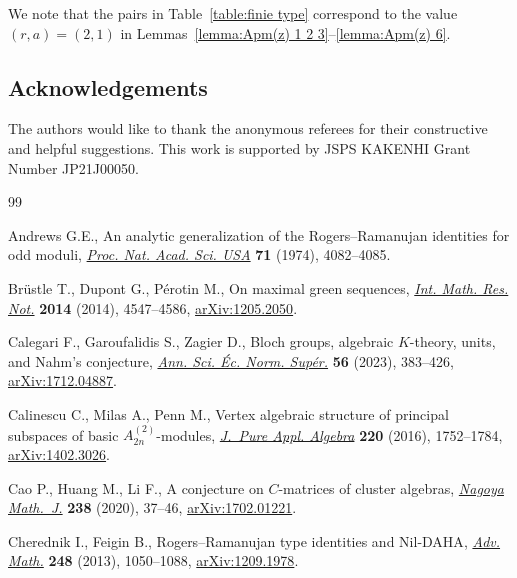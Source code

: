\documentclass[pdftex]{sigma}
\numberwithin{equation}{section}
\theoremstyle{definition}
\begin{document}
We note that the pairs in Table~\ref{table:finie type} correspond to the
value $(r, a) = (2, 1)$ in Lemmas~\ref{lemma:Apm(z) 1 2 3}--\ref{lemma:Apm(z) 6}.

\subsection*{Acknowledgements}
 The authors would like to thank the anonymous referees for their constructive and helpful suggestions.
	This work is supported by JSPS KAKENHI Grant Number JP21J00050.

\begin{thebibliography}{99}
\footnotesize\itemsep=0pt

Andrews G.E., An analytic generalization of the {R}ogers--{R}amanujan
 identities for odd moduli,
 \href{https://doi.org/10.1073/pnas.71.10.4082}{\textit{Proc. Nat. Acad. Sci.
 USA}} \textbf{71} (1974), 4082--4085.

Br\"ustle T., Dupont G., P\'erotin M., On maximal green sequences,
 \href{https://doi.org/10.1093/imrn/rnt075}{\textit{Int. Math. Res. Not.}}
 \textbf{2014} (2014), 4547--4586,
 \href{http://arxiv.org/abs/1205.2050}{arXiv:1205.2050}.

Calegari F., Garoufalidis S., Zagier D., Bloch groups, algebraic {$K$}-theory,
 units, and {N}ahm's conjecture,
 \href{https://doi.org/10.24033/asens.2537}{\textit{Ann. Sci. \'Ec. Norm.
 Sup\'er.}} \textbf{56} (2023), 383--426,
 \href{http://arxiv.org/abs/1712.04887}{arXiv:1712.04887}.

Calinescu C., Milas A., Penn M., Vertex algebraic structure of principal
 subspaces of basic {$A_{2n}^{(2)}$}-modules,
 \href{https://doi.org/10.1016/j.jpaa.2015.10.001}{\textit{J.~Pure Appl.
 Algebra}} \textbf{220} (2016), 1752--1784,
 \href{http://arxiv.org/abs/1402.3026}{arXiv:1402.3026}.

Cao P., Huang M., Li F., A conjecture on {$C$}-matrices of cluster algebras,
 \href{https://doi.org/10.1017/nmj.2018.18}{\textit{Nagoya Math.~J.}}
 \textbf{238} (2020), 37--46,
 \href{http://arxiv.org/abs/1702.01221}{arXiv:1702.01221}.

Cherednik I., Feigin B., Rogers--{R}amanujan type identities and {N}il-{DAHA},
 \href{https://doi.org/10.1016/j.aim.2013.08.025}{\textit{Adv. Math.}}
 \textbf{248} (2013), 1050--1088,
 \href{http://arxiv.org/abs/1209.1978}{arXiv:1209.1978}.


\end{thebibliography}
\end{document}

